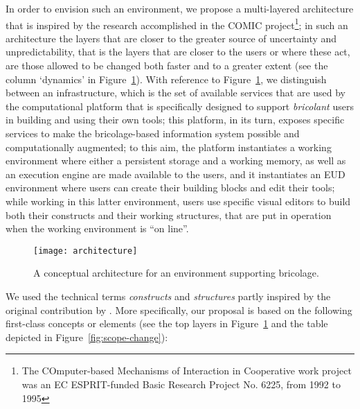 \documentclass{article}
\begin{document}
In order to envision such an environment, we propose a multi-layered architecture that is inspired by the research accomplished in the COMIC project\footnote{The COmputer-based Mechanisms of Interaction in Cooperative work project was an EC ESPRIT-funded Basic Research
Project No. 6225, from 1992 to 1995}; in such an architecture the layers that are closer to the greater source of uncertainty and unpredictability, that is the layers that are closer to the users or where these act, are those allowed to be changed both faster and to a greater extent (see the column `dynamics' in Figure~\ref{fig:architecture}). With reference to Figure~\ref{fig:architecture}, we distinguish between an infrastructure, which is the set of available services that are used by the computational platform that is specifically designed to support \emph{bricolant} users in building and using their own tools; this platform, in its turn, exposes specific services to make the bricolage-based information system possible and computationally augmented; to this aim, the platform instantiates a working environment where either a persistent storage and a working memory, as well as an execution engine are made available to the users, and it instantiates an EUD environment where users can create their building blocks and edit their tools; while working in this latter environment, users use specific visual editors to build both their constructs and their working structures, that are put in operation when the working environment is ``on line''. 


\begin{figure}[tbh]
  \centering
      \texttt{[image: architecture]}
  \caption{A conceptual architecture for an environment supporting bricolage.}
  \label{fig:architecture}
\end{figure}

We used the technical terms \emph{constructs} and \emph{structures} partly inspired by the original contribution by \citet{lanzara_between_1999}. More specifically, our proposal is based on the following first-class concepts or elements (see the top layers in Figure~\ref{fig:architecture} and the table depicted in Figure~\ref{fig:scope-change}):
\end{document}
